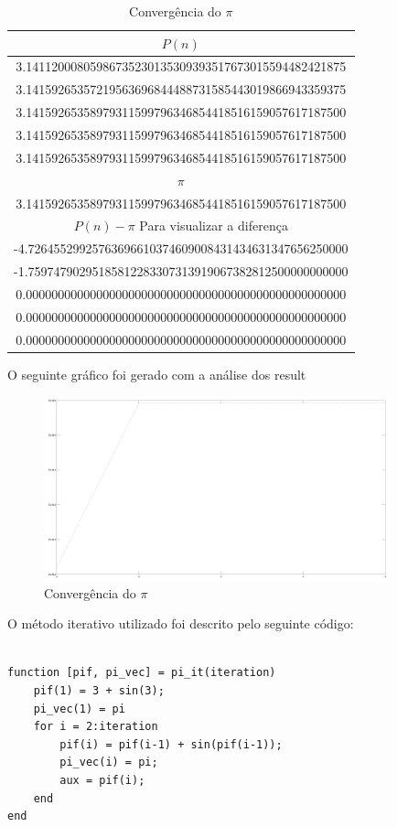 \documentclass[a4paper]{article}
\begin{document}
\begin{table}[H]
	\centering
	\begin{tabular}{|c|}
    	\hline
		$P(n)$ \\
		\hline
		3.14112000805986735230135309393517673015594482421875 \\
		\hline
		3.14159265357219563696844488731585443019866943359375 \\
		\hline
		3.14159265358979311599796346854418516159057617187500 \\
		\hline
		3.14159265358979311599796346854418516159057617187500 \\
		\hline
		3.14159265358979311599796346854418516159057617187500 \\
		\hline
		\hline
		$\pi$ \\
		\hline
		3.14159265358979311599796346854418516159057617187500 \\
		\hline
		\hline
		$P(n) - \pi$  Para visualizar a diferença \\
		\hline
		-4.72645529925763696610374609008431434631347656250000 \\
		\hline
		-1.75974790295185812283307313919067382812500000000000 \\
		\hline
		0.00000000000000000000000000000000000000000000000000 \\
		\hline
		0.00000000000000000000000000000000000000000000000000 \\
		\hline
		0.00000000000000000000000000000000000000000000000000 \\
		\hline
	\end{tabular}
	\label{pi_magic}
	\caption{Convergência do $\pi$}
\end{table}

O seguinte gráfico foi gerado com a análise dos result

\begin{figure}[H]
    \centering
    \includegraphics[width=100mm]{pi_magic.png}
    \caption{Convergência do $\pi$}
    \label{pi_magic}
\end{figure}

O método iterativo utilizado foi descrito pelo seguinte código:

\begin{lstlisting}

function [pif, pi_vec] = pi_it(iteration)
	pif(1) = 3 + sin(3);
	pi_vec(1) = pi
	for i = 2:iteration
		pif(i) = pif(i-1) + sin(pif(i-1));
		pi_vec(i) = pi;
		aux = pif(i);
	end
end

\end{lstlisting}






\end{document}
